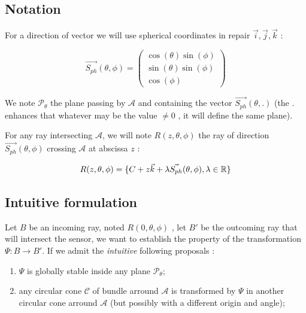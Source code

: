 
\subsection{Notation}

For a direction of vector we will use spherical coordinates in repair $\vec{i},\vec{j},\vec{k}$ :

\begin{equation}
	\vec{S_{ph}}(\theta,\phi)   =\begin{pmatrix}  \cos(\theta) \sin(\phi) \\ \sin(\theta) \sin(\phi)  \\ \cos(\phi) \end{pmatrix}
	     \label{PC:Spher:Coord}
\end{equation}

We  note $\mathcal{P}_{\theta}$  the plane passing by $\mathcal{A}$ and containing the vector    $\vec{S_{ph}}(\theta,.)$
(the $.$ enhances that whatever may be the value $\neq 0$ , it will define the same plane).

For any ray intersecting $\mathcal{A}$, we will note $R(z,\theta,\phi)$ the ray of direction $\vec{S_{ph}}(\theta,\phi)$  crossing $\mathcal{A}$
at abscissa $z$  :

\begin{equation}
	R(z,\theta,\phi) = \{C+ z \vec{k} + \lambda \vec{S_{ph}}(\theta,\phi), \lambda \in \mathbb{R}\}
	     \label{PC:RayParam}
\end{equation}



\subsection{Intuitive formulation}

Let $B$ be an incoming ray, noted $ R(0,\theta,\phi)$ , let $B'$ be the outcoming ray  that will intersect the sensor,
we want to establish the property of the transformation  $ \Psi : B \rightarrow B'$.
If we admit the \emph{intuitive} following proposals :


\begin{proposal}  \;
\label{PhysRadMod}
\begin{enumerate}
    \item  $\Psi$ is globally stable inside any plane  $\mathcal{P}_{\theta}$; \label{PhysRadModPlane}

    \item  any  circular cone $\mathcal{C}$ of bundle  arround $\mathcal{A}$ is
	    transformed by $\Psi$ in another circular cone arround $\mathcal{A}$  (but possibly with a different origin and angle);
\end{enumerate}
\end{proposal}

